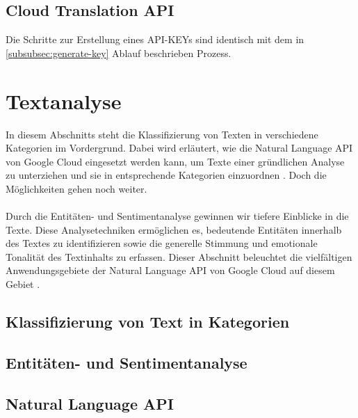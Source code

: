 \documentclass[12pt,a4paper]{article}
\begin{document}
\subsection{Cloud Translation API}
Die Schritte zur Erstellung eines API-KEYs sind identisch mit dem in \ref{subsubsec:generate-key} Ablauf beschrieben Prozess.







\newpage
\section{Textanalyse}
In diesem Abschnitts steht die Klassifizierung von Texten in verschiedene Kategorien im Vordergrund. Dabei wird erläutert, wie die Natural Language API von Google Cloud eingesetzt werden kann, um Texte einer gründlichen Analyse zu unterziehen und sie in entsprechende Kategorien einzuordnen \cite{classtext2023}. Doch die Möglichkeiten gehen noch weiter. 
\\ \\
Durch die Entitäten- und Sentimentanalyse gewinnen wir tiefere Einblicke in die Texte. Diese Analysetechniken ermöglichen es, bedeutende Entitäten innerhalb des Textes zu identifizieren sowie die generelle Stimmung und emotionale Tonalität des Textinhalts zu erfassen. Dieser Abschnitt beleuchtet die vielfältigen Anwendungsgebiete der Natural Language API von Google Cloud auf diesem Gebiet \cite{entitysentiment2023}.
\subsection{Klassifizierung von Text in Kategorien}
\subsection{Entitäten- und Sentimentanalyse}
\subsection{Natural Language API}



\newpage
\thispagestyle{empty}
\printbibliography
\end{document}
